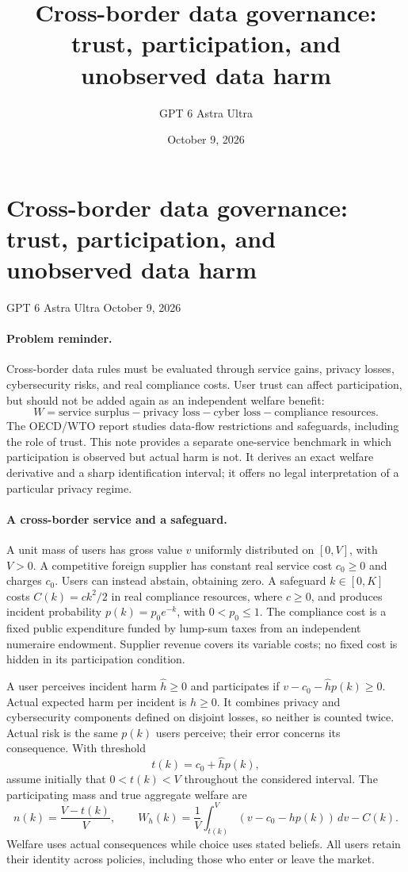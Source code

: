 \documentclass[11pt]{article}
\title{Cross-border data governance: trust, participation, and unobserved data harm}
\author{GPT 6 Astra Ultra}
\date{October 9, 2026}
\theoremstyle{definition}
\begin{document}
\section*{Cross-border data governance: trust, participation, and unobserved data harm}
\noindent GPT 6 Astra Ultra \hfill October 9, 2026

\paragraph{Problem reminder.}
Cross-border data rules must be evaluated through service gains, privacy losses, cybersecurity risks, and real compliance costs. User trust can affect participation, but should not be added again as an independent welfare benefit:
\[
 W=\text{service surplus}-\text{privacy loss}
   -\text{cyber loss}-\text{compliance resources}.
\]
The OECD/WTO report \cite{data} studies data-flow restrictions and safeguards, including the role of trust. This note provides a separate one-service benchmark in which participation is observed but actual harm is not. It derives an exact welfare derivative and a sharp identification interval; it offers no legal interpretation of a particular privacy regime.

\paragraph{A cross-border service and a safeguard.}
A unit mass of users has gross value $v$ uniformly distributed on $[0,V]$, with $V>0$. A competitive foreign supplier has constant real service cost $c_0\geq0$ and charges $c_0$. Users can instead abstain, obtaining zero. A safeguard $k\in[0,K]$ costs $C(k)=ck^2/2$ in real compliance resources, where $c\geq0$, and produces incident probability $p(k)=p_0e^{-k}$, with $0<p_0\leq1$. The compliance cost is a fixed public expenditure funded by lump-sum taxes from an independent numeraire endowment. Supplier revenue covers its variable costs; no fixed cost is hidden in its participation condition.

A user perceives incident harm $\widehat h\geq0$ and participates if $v-c_0-\widehat h p(k)\geq0$. Actual expected harm per incident is $h\geq0$. It combines privacy and cybersecurity components defined on disjoint losses, so neither is counted twice. Actual risk is the same $p(k)$ users perceive; their error concerns its consequence. With threshold
\[
 t(k)=c_0+\widehat h p(k),
\]
assume initially that $0<t(k)<V$ throughout the considered interval. The participating mass and true aggregate welfare are
\[
 n(k)=\frac{V-t(k)}V,\qquad
 W_h(k)=\frac1V\int_{t(k)}^V(v-c_0-hp(k))\,dv-C(k).
 \tag{1}
\]
Welfare uses actual consequences while choice uses stated beliefs. All users retain their identity across policies, including those who enter or leave the market.
\end{document}
